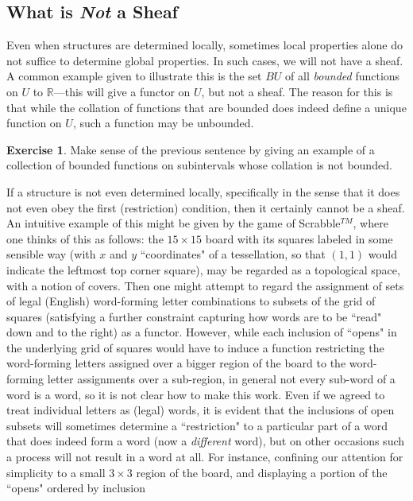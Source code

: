 \documentclass[a4paper]{book}
\theoremstyle{definition}
\theoremstyle{definition}
\theoremstyle{definition}
\theoremstyle{theorem}
\theoremstyle{definition}
\newtheorem{exercise}{Exercise}[section]
\begin{document}
\subsection{What is \textit{Not} a Sheaf}
Even when structures are determined locally, sometimes local properties alone do not suffice to determine global properties. In such cases, we will not have a sheaf. A common example given to illustrate this is the set $BU$ of all \textit{bounded} functions on $U$ to $\mathbb{R}$---this will give a functor on $U$, but not a sheaf. The reason for this is that while the collation of functions that are bounded does indeed define a unique function on $U$, such a function may be unbounded. \par
\begin{exercise}
	Make sense of the previous sentence by giving an example of a collection of bounded functions on subintervals whose collation is not bounded.
\end{exercise}
If a structure is not even determined locally, specifically in the sense that it does not even obey the first (restriction) condition, then it certainly cannot be a sheaf. An intuitive example of this might be given by the game of Scrabble$^{TM}$, where one thinks of this as follows: the $15 \times 15$ board with its squares labeled in some sensible way (with $x$ and $y$ ``coordinates" of a tessellation, so that $(1,1)$ would indicate the leftmost top corner square), may be regarded as a topological space, with a notion of covers. Then one might attempt to regard the assignment of sets of legal (English) word-forming letter combinations to subsets of the grid of squares (satisfying a further constraint capturing how words are to be ``read" down and to the right) as a functor. However, while each inclusion of ``opens" in the underlying grid of squares would have to induce a function restricting the word-forming letters assigned over a bigger region of the board to the word-forming letter assignments over a sub-region, in general not every sub-word of a word is a word, so it is not clear how to make this work. Even if we agreed to treat individual letters as (legal) words, it is evident that the inclusions of open subsets will sometimes determine a ``restriction" to a particular part of a word that does indeed form a word (now a \textit{different} word), but on other occasions such a process will not result in a word at all. For instance, confining our attention for simplicity to a small $3 \times 3$ region of the board, and displaying a portion of the ``opens" ordered by inclusion
\end{document}
